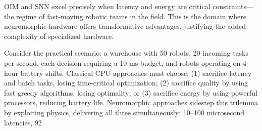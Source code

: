 OIM and SNN excel precisely when latency and energy are critical constraints---the regime of fast-moving robotic teams in the field. This is the domain where neuromorphic hardware offers transformative advantages, justifying the added complexity of specialized hardware.

Consider the practical scenario: a warehouse with 50 robots, 20 incoming tasks per second, each decision requiring a 10 ms budget, and robots operating on 4-hour battery shifts. Classical CPU approaches must choose: (1) sacrifice latency and batch tasks, losing time-critical optimization; (2) sacrifice quality by using fast greedy algorithms, losing optimality; or (3) sacrifice energy by using powerful processors, reducing battery life. Neuromorphic approaches sidestep this trilemma by exploiting physics, delivering all three simultaneously: 10--100 microsecond latencies, 92%

